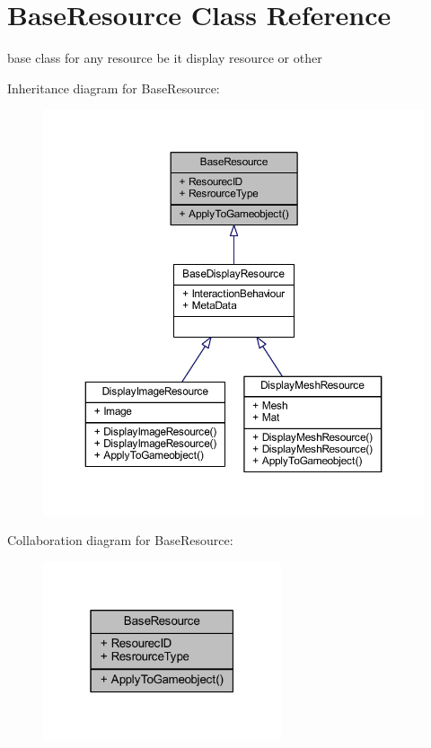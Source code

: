 \hypertarget{class_base_resource}{}\section{Base\+Resource Class Reference}
\label{class_base_resource}


base class for any resource be it display resource or other  




Inheritance diagram for Base\+Resource\+:
\nopagebreak
\begin{figure}[H]
\begin{center}
\leavevmode
\includegraphics[width=350pt]{class_base_resource__inherit__graph}
\end{center}
\end{figure}


Collaboration diagram for Base\+Resource\+:
\nopagebreak
\begin{figure}[H]
\begin{center}
\leavevmode
\includegraphics[width=199pt]{class_base_resource__coll__graph}
\end{center}
\end{figure}
